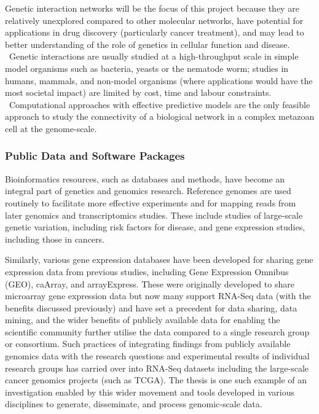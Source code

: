 Genetic interaction networks will be the focus of this project because they are relatively unexplored compared to other molecular networks, have potential for applications in drug discovery (particularly cancer treatment), and may lead to better understanding of the role of genetics in cellular function and disease. \ Genetic interactions are usually studied at a high-throughput scale in simple model organisms such as bacteria, yeasts or the nematode worm; studies in humans, mammals, and non-model organisms (where applications would have the most societal impact) are limited by cost, time and labour constraints. \ Computational approaches with effective predictive models are the only feasible approach to study the connectivity of a biological network in a complex metazoan cell at the genome-scale.


\subsubsection{Public Data and Software Packages}
Bioinformatics resources, such as databases and methods, have become an integral part of genetics and genomics research. Reference genomes are used routinely to facilitate more effective experiments and for mapping reads from later genomics and transcriptomics studies. These include studies of large-scale genetic variation, including risk factors for disease, and gene expression studies, including those in cancers.

Similarly, various gene expression databases have been developed for sharing gene expression data from previous studies, including Gene Expression Omnibus (GEO), caArray, and arrayExpress. These were originally developed to share microarray gene expression data but now many support RNA-Seq data (with the benefits discussed previously) and have set a precedent for data sharing, data mining, and the wider benefits of publicly available data for enabling the scientific community further utilise the data compared to a single research group or consortium. Such practices of integrating findings from publicly available genomics data with the research questions and experimental results of individual research groups has carried over into RNA-Seq datasets including the large-scale cancer genomics projects (such as TCGA). The thesis is one such example of an investigation enabled by this wider movement and tools developed in various disciplines to generate, disseminate, and process genomic-scale data.
 
